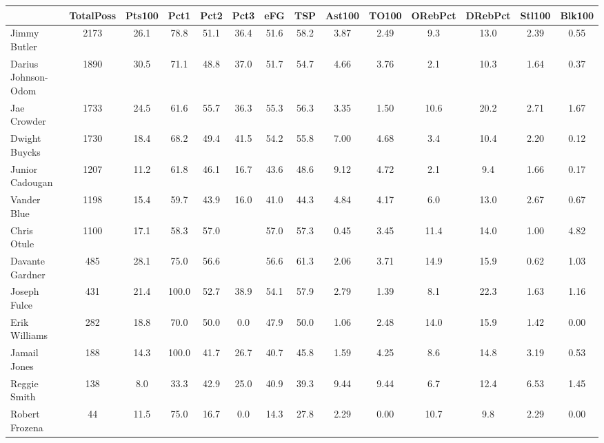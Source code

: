 \documentclass[10pt,letterpaper]{article}
\begin{document}
\begin{table}[ht]
\begin{center}
\begin{tabular}{lccccccccccccc}
  \hline
 & TotalPoss & Pts100 & Pct1 & Pct2 & Pct3 & eFG & TSP & Ast100 & TO100 & ORebPct & DRebPct & Stl100 & Blk100 \\ 
  \hline
Jimmy Butler & 2173 & 26.1 & 78.8 & 51.1 & 36.4 & 51.6 & 58.2 & 3.87 & 2.49 & 9.3 & 13.0 & 2.39 & 0.55 \\ 
  Darius Johnson-Odom & 1890 & 30.5 & 71.1 & 48.8 & 37.0 & 51.7 & 54.7 & 4.66 & 3.76 & 2.1 & 10.3 & 1.64 & 0.37 \\ 
  Jae Crowder & 1733 & 24.5 & 61.6 & 55.7 & 36.3 & 55.3 & 56.3 & 3.35 & 1.50 & 10.6 & 20.2 & 2.71 & 1.67 \\ 
  Dwight Buycks & 1730 & 18.4 & 68.2 & 49.4 & 41.5 & 54.2 & 55.8 & 7.00 & 4.68 & 3.4 & 10.4 & 2.20 & 0.12 \\ 
  Junior Cadougan & 1207 & 11.2 & 61.8 & 46.1 & 16.7 & 43.6 & 48.6 & 9.12 & 4.72 & 2.1 & 9.4 & 1.66 & 0.17 \\ 
  Vander Blue & 1198 & 15.4 & 59.7 & 43.9 & 16.0 & 41.0 & 44.3 & 4.84 & 4.17 & 6.0 & 13.0 & 2.67 & 0.67 \\ 
  Chris Otule & 1100 & 17.1 & 58.3 & 57.0 &  & 57.0 & 57.3 & 0.45 & 3.45 & 11.4 & 14.0 & 1.00 & 4.82 \\ 
  Davante Gardner & 485 & 28.1 & 75.0 & 56.6 &  & 56.6 & 61.3 & 2.06 & 3.71 & 14.9 & 15.9 & 0.62 & 1.03 \\ 
  Joseph Fulce & 431 & 21.4 & 100.0 & 52.7 & 38.9 & 54.1 & 57.9 & 2.79 & 1.39 & 8.1 & 22.3 & 1.63 & 1.16 \\ 
  Erik Williams & 282 & 18.8 & 70.0 & 50.0 & 0.0 & 47.9 & 50.0 & 1.06 & 2.48 & 14.0 & 15.9 & 1.42 & 0.00 \\ 
  Jamail Jones & 188 & 14.3 & 100.0 & 41.7 & 26.7 & 40.7 & 45.8 & 1.59 & 4.25 & 8.6 & 14.8 & 3.19 & 0.53 \\ 
  Reggie Smith & 138 & 8.0 & 33.3 & 42.9 & 25.0 & 40.9 & 39.3 & 9.44 & 9.44 & 6.7 & 12.4 & 6.53 & 1.45 \\ 
  Robert Frozena & 44 & 11.5 & 75.0 & 16.7 & 0.0 & 14.3 & 27.8 & 2.29 & 0.00 & 10.7 & 9.8 & 2.29 & 0.00 \\ 
   \hline
\end{tabular}
\end{center}
\end{table}
\end{document}
